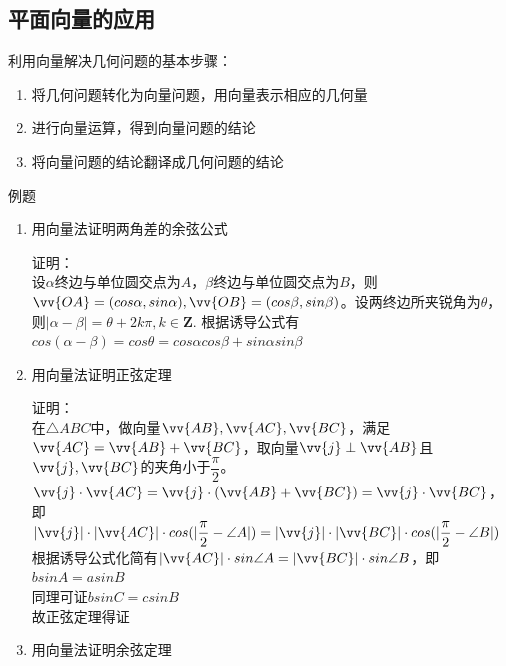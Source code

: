 \subsection*{平面向量的应用}
利用向量解决几何问题的基本步骤：
\begin{enumerate}
    \item 将几何问题转化为向量问题，用向量表示相应的几何量
    \item 进行向量运算，得到向量问题的结论
    \item 将向量问题的结论翻译成几何问题的结论
\end{enumerate}
例题
\begin{enumerate}
    \item 用向量法证明两角差的余弦公式
    \begin{jieda}
        证明：\\
        设$\alpha$终边与单位圆交点为$A$，$\beta$终边与单位圆交点为$B$，则$\vv{OA} = (cos\alpha, sin\alpha), \vv{OB} = (cos\beta, sin\beta)$。设两终边所夹锐角为$\theta$，则$|\alpha - \beta| = \theta + 2k\pi, k \in \mathbf{Z}$. 根据诱导公式有$cos(\alpha - \beta) = cos\theta = cos\alpha cos\beta + sin\alpha sin \beta$
    \end{jieda}
    \item 用向量法证明正弦定理
    \begin{jieda}
        证明：\\
        在$\triangle ABC$中，做向量$\vv{AB}, \vv{AC}, \vv{BC}$，满足$\vv{AC} = \vv{AB} 
         + \vv{BC}$，取向量$\vv{j} \perp \vv{AB}$且$\vv{j}, \vv{BC}$的夹角小于$\dfrac{\pi}{2}$。\\
         $\vv{j} \cdot \vv{AC} = \vv{j} \cdot (\vv{AB} 
         + \vv{BC}) = \vv{j} \cdot \vv{BC}$，即$|\vv{j}| \cdot |\vv{AC}| \cdot cos(|\dfrac{\pi}{2} - \angle A|) = |\vv{j}| \cdot |\vv{BC}| \cdot cos(|\dfrac{\pi}{2} - \angle B|)$ \\
         根据诱导公式化简有$|\vv{AC}| \cdot sin\angle A = |\vv{BC}| \cdot sin \angle B$，即$b sinA = a sinB$ \\
         同理可证$b sinC = c sinB$ \\
         故正弦定理得证
    \end{jieda} 
    \item 用向量法证明余弦定理
\end{enumerate}
